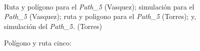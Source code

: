 \documentclass[]{report}
\begin{document}
\begin{figure}%
	\centering
	\hspace{8pt}%
	 \\
	\hspace{8pt}%
	\caption[A set of four subfigures.]{Polígono y ruta cinco:}
	 Ruta y polígono para el \textit{Path\_5} (Vasquez);
	 simulación para el \textit{Path\_5} (Vasquez);
	 ruta y poligono para el \textit{Path\_5} (Torres); y,
	 simulación del \textit{Path\_5.} (Torres)%
	\label{path_5}%
\end{figure}
\end{document}
